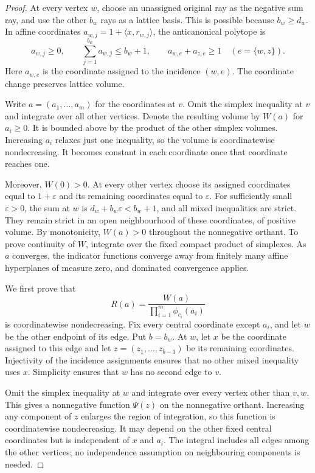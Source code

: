 \begin{proof}
At every vertex $w$, choose an unassigned original ray as the negative
sum ray, and use the other $b_w$ rays as a lattice basis. This is
possible because $b_w\ge d_w$. In affine coordinates
$a_{w,j}=1+\langle x,r_{w,j}\rangle$, the anticanonical polytope is
\begin{equation}\label{branch:graph-polytope}
 a_{w,j}\ge0,\qquad
 \sum_{j=1}^{b_w}a_{w,j}\le b_w+1,\qquad
 a_{w,e}+a_{z,e}\ge1\quad(e=\{w,z\}).
\end{equation}
Here $a_{w,e}$ is the coordinate assigned to the incidence $(w,e)$.
The coordinate change preserves lattice volume.

Write $a=(a_1,\ldots,a_m)$ for the coordinates at $v$. Omit the simplex inequality at $v$ and integrate over all other
vertices. Denote the resulting volume by $W(a)$ for $a_i\ge0$.
It is bounded above by the product of the other simplex volumes.
Increasing $a_i$ relaxes just one inequality, so the volume is
coordinatewise nondecreasing. It becomes constant in each coordinate
once that coordinate reaches one.

Moreover, $W(0)>0$. At every other vertex choose its assigned
coordinates equal to $1+\varepsilon$ and its remaining coordinates
equal to $\varepsilon$. For sufficiently small $\varepsilon>0$, the
sum at $w$ is $d_w+b_w\varepsilon<b_w+1$, and all mixed inequalities
are strict. They remain strict in an open neighbourhood of these
coordinates, of positive volume. By monotonicity,
$W(a)>0$ throughout the nonnegative orthant. To prove continuity of
$W$, integrate over the fixed compact product of simplexes. As $a$
converges, the indicator functions converge away from finitely many
affine hyperplanes of measure zero, and dominated convergence applies.

We first prove that
\begin{equation}\label{branch:ratio}
 R(a)=\frac{W(a)}{\prod_{i=1}^m\phi_{c_i}(a_i)}
\end{equation}
is coordinatewise nondecreasing. Fix every central coordinate except
$a_i$, and let $w$ be the other endpoint of its edge. Put $b=b_w$.
At $w$, let $x$ be the coordinate assigned to this edge and let
$z=(z_1,\ldots,z_{b-1})$ be its remaining coordinates. Injectivity of
the incidence assignments ensures that no other mixed inequality
uses $x$. Simplicity ensures that $w$ has no second edge to $v$.

Omit the simplex inequality at $w$ and integrate over every vertex
other than $v,w$. This gives a nonnegative function $\Psi(z)$ on the
nonnegative orthant. Increasing any component of $z$ enlarges the
region of integration, so this function is coordinatewise
nondecreasing. It may depend on the other fixed central coordinates
but is independent of $x$ and $a_i$. The integral includes all edges
among the other vertices; no independence assumption on neighbouring
components is needed.


\end{proof}
